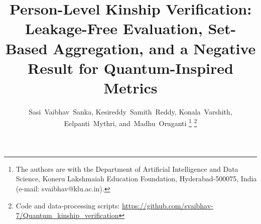 \documentclass[journal,12pt]{IEEEtran}
\begin{document}
\title{Person-Level Kinship Verification: Leakage-Free Evaluation, Set-Based
Aggregation, and a Negative Result for Quantum-Inspired Metrics}

\author{Sasi~Vaibhav~Sanka,
        Kesireddy~Samith~Reddy,
        Konala~Varshith,
        Eelpanti~Mythri,
        and~Madhu~Oruganti%
\thanks{The authors are with the Department of Artificial Intelligence and Data Science, Koneru Lakshmaiah Education Foundation, Hyderabad-500075, India (e-mail: svaibhav@klu.ac.in).}%
\thanks{Code and data-processing scripts: \url{https://github.com/svaibhav-7/Quantum_kinship_verification}}}

\maketitle
\end{document}
